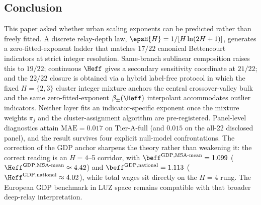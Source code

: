 \subsection{Conclusion}

This paper asked whether urban scaling exponents can be predicted rather than
freely fitted.
A discrete relay-depth law,
\(\epsH{H}=1/[H\ln(2H+1)]\), generates a zero-fitted-exponent ladder that matches
\(17/22\) canonical Bettencourt indicators at strict integer resolution.
Same-branch sublinear composition raises this to \(19/22\); continuous
\(\Heff\) gives a secondary sensitivity coordinate at \(21/22\); and the
\(22/22\) closure is obtained via a hybrid label-free protocol in which
the fixed \(H{=}\{2,3\}\) cluster integer mixture anchors the central
crossover-valley bulk and the same zero-fitted-exponent
\(\beta_{\pm}(\Heff)\) interpolant accommodates outlier indicators. Neither
layer fits an indicator-specific exponent once the mixture weights
\(\pi_j\) and the cluster-assignment algorithm are pre-registered.
Panel-level diagnostics attain \(\mathrm{MAE}=0.017\) on Tier-A-full (and $0.015$ on the all-22 disclosed panel), and the result
survives four explicit null-model confrontations.
The correction of the GDP anchor sharpens the theory rather than weakening it:
the correct reading is an \(H=4\)--5 corridor, with
\(\beff^{\mathrm{GDP,MSA\text{-}mean}}=1.099\)
(\(\Heff^{\mathrm{GDP,MSA\text{-}mean}}\approx 4.42\)) and
\(\beff^{\mathrm{GDP,national}}=1.113\)
(\(\Heff^{\mathrm{GDP,national}}\approx 4.02\)),
while total wages sit directly on the \(H=4\) rung.
The European GDP benchmark in LUZ space remains compatible with that broader
deep-relay interpretation.


